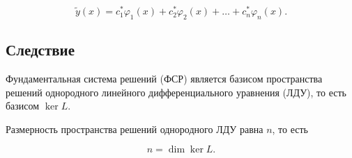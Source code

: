 {	\[
	\widetilde{y}(x) = c^*_1 \varphi_1(x) + c^*_2 \varphi_2(x) + \ldots + c^*_n \varphi_n(x).
	\]

	\subsection*{Следствие}

	Фундаментальная система решений (ФСР) является базисом пространства решений однородного линейного дифференциального уравнения (ЛДУ), то есть базисом \( \ker L \).

	Размерность пространства решений однородного ЛДУ равна \( n \), то есть


	\[
	n = \dim \ker L.
	\]

	\newpage
}